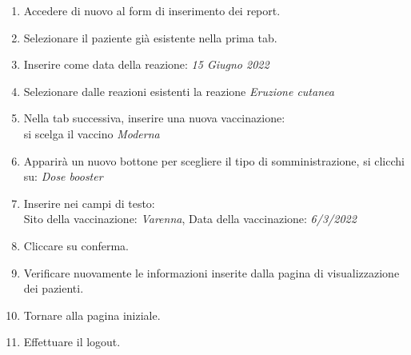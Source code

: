 \documentclass[11pt]{article}
\begin{document}
\begin{enumerate}
                \item Accedere di nuovo al form di inserimento dei report.
                \item Selezionare il paziente già esistente nella prima tab.
                \item Inserire come data della reazione: \textit{15 Giugno 2022}
                \item Selezionare dalle reazioni esistenti la reazione \textit{Eruzione cutanea}
                \item Nella tab successiva, inserire una nuova vaccinazione:\\
                    si scelga il vaccino \textit{Moderna}
                \item Apparirà un nuovo bottone per scegliere il tipo di somministrazione, si clicchi su: \textit{Dose booster}
                \item Inserire nei campi di testo:\\
                    Sito della vaccinazione: \textit{Varenna}, Data della vaccinazione: \textit{6/3/2022}
                \item Cliccare su conferma.
                \item Verificare nuovamente le informazioni inserite dalla pagina di visualizzazione dei pazienti.
                \item Tornare alla pagina iniziale.
                \item Effettuare il logout.
            \end{enumerate}
\end{document}
